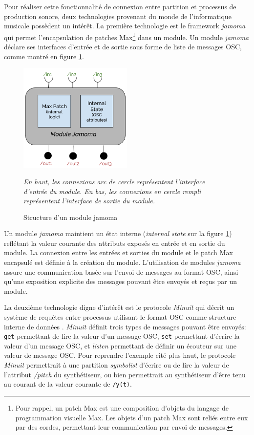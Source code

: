 Pour réaliser cette fonctionnalité de connexion entre partition et processus de production sonore, deux technologies provenant du monde de l'informatique musicale possèdent un intérêt. La première technologie est le framework \textit{jamoma} qui permet l'encapsulation de patches Max\footnote{Pour rappel, un patch Max est une composition d'objets du langage de programmation visuelle Max. Les objets d'un patch Max sont reliés entre eux par des cordes, permettant leur communication par envoi de messages.} dans un module. Un module \textit{jamoma} déclare ses interfaces d'entrée et de sortie sous forme de liste de messages OSC, comme montré en figure \ref{fig:jamomaModule}.
\begin{figure}[H]
	\centering
	\includegraphics[keepaspectratio=true, width=0.5\textwidth]{ModeleDeNotation/i/jamomaModule.png}
	\caption{Structure d'un module jamoma}
	\label{fig:jamomaModule}
	\small
	\textit{ En haut, les connexions arc de cercle représentent l'interface d'entrée du module. En bas, les connexions en cercle rempli représentent l'interface de sortie du module.}
\end{figure}
Un module \textit{jamoma} maintient un état interne (\textit{internal state} sur la figure \ref{fig:jamomaModule}) reflétant la valeur courante des attributs exposés en entrée et en sortie du module.
La connexion entre les entrées et sorties du module et le patch Max encapsulé est définie à la création du module.
L'utilisation de modules \textit{jamoma} assure une communication basée sur l'envoi de messages au format OSC, ainsi qu'une exposition explicite des messages pouvant être envoyés et reçus par un module. 

La deuxième technologie digne d'intérêt est le protocole \textit{Minuit} qui décrit un système de requêtes entre processus utilisant le format OSC comme structure interne de données \cite{minuit2010}. \textit{Minuit} définit trois types de messages pouvant être envoyés: \texttt{get} permettant de lire la valeur d'un message OSC, \texttt{set} permettant d'écrire la valeur d'un message OSC, et \textit{listen} permettant de définir un écouteur sur une valeur de message OSC. Pour reprendre l'exemple cité plus haut, le protocole \textit{Minuit} permettrait à une partition \textit{symbolist} d'écrire ou de lire la valeur de l'attribut \textit{/pitch} du synthétiseur, ou bien permettrait au synthétiseur d'être tenu au courant de la valeur courante de \texttt{/y(t)}.

